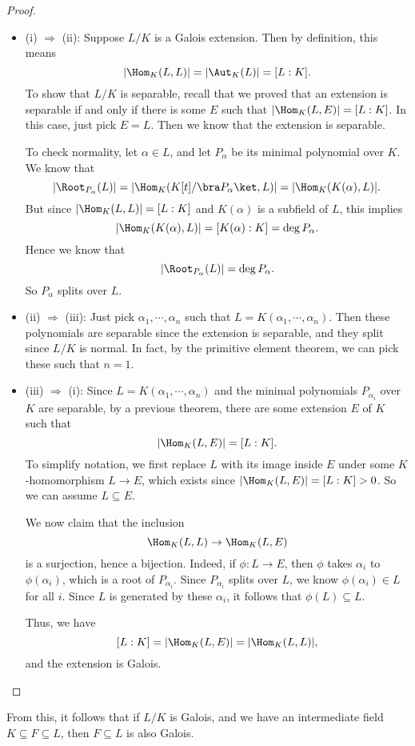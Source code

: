 \documentclass[a4paper]{article}
\begin{document}
\begin{proof}\leavevmode
  \begin{itemize}
    \item (i) $\Rightarrow$ (ii): Suppose $L/K$ is a Galois extension. Then by definition, this means
      \[
        |\Hom_K(L, L)| = |\Aut_K(L)| = [L:K].
      \]
      To show that $L/K$ is separable, recall that we proved that an extension is separable if and only if there is some $E$ such that $|\Hom_K(L, E)| = [L:K]$. In this case, just pick $E = L$. Then we know that the extension is separable.

      To check normality, let $\alpha \in L$, and let $P_\alpha$ be its minimal polynomial over $K$. We know that
      \[
        |\Root_{P_\alpha}(L)| = |\Hom_K(K[t]/\bra P_\alpha\ket, L)| = |\Hom_K(K(\alpha), L)|.
      \]
      But since $|\Hom_K(L, L)| = [L:K]$ and $K(\alpha)$ is a subfield of $L$, this implies
      \[
        |\Hom_K(K(\alpha), L)| = [K(\alpha): K] = \deg P_\alpha.
      \]
      Hence we know that
      \[
        |\Root_{P_\alpha}(L)| = \deg P_\alpha.
      \]
      So $P_\alpha$ splits over $L$.
    \item (ii) $\Rightarrow$ (iii): Just pick $\alpha_1, \cdots, \alpha_n$ such that $L = K(\alpha_1, \cdots, \alpha_n)$. Then these polynomials are separable since the extension is separable, and they split since $L/K$ is normal. In fact, by the primitive element theorem, we can pick these such that $n = 1$.

    \item (iii) $\Rightarrow$ (i): Since $L = K(\alpha_1, \cdots, \alpha_n)$ and the minimal polynomials $P_{\alpha_i}$ over $K$ are separable, by a previous theorem, there are some extension $E$ of $K$ such that
      \[
        |\Hom_K(L, E)| = [L:K].
      \]
      To simplify notation, we first replace $L$ with its image inside $E$ under some $K$-homomorphism $L \to E$, which exists since $|\Hom_K(L, E)| = [L:K] > 0$. So we can assume $L\subseteq E$.

      We now claim that the inclusion
      \[
        \Hom_K(L, L) \to \Hom_K(L, E)
      \]
      is a surjection, hence a bijection. Indeed, if $\phi: L \to E$, then $\phi$ takes $\alpha_i$ to $\phi(\alpha_i)$, which is a root of $P_{\alpha_i}$. Since $P_{\alpha_i}$ splits over $L$, we know $\phi(\alpha_i) \in L$ for all $i$. Since $L$ is generated by these $\alpha_i$, it follows that $\phi(L) \subseteq L$.

      Thus, we have
      \[
        [L:K] = |\Hom_K(L, E)| = |\Hom_K(L, L)|,
      \]
      and the extension is Galois.
  \end{itemize}
\end{proof}
From this, it follows that if $L/K$ is Galois, and we have an intermediate field $K\subseteq F \subseteq L$, then $F\subseteq L$ is also Galois.
\end{document}
